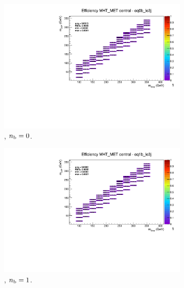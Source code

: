 \begin{figure}[h!]
  \centering
  \begin{subfigure}[b]{0.4\textwidth}
    \includegraphics[width=\textwidth, page=5]{Figs/sms/t2cc/v37/systs/T2cc_MHT_MET_eq0b_le3j.pdf}
    \caption{\njlow, $n_{\text{b}} = 0$.}
  \end{subfigure}
  \begin{subfigure}[b]{0.4\textwidth}
    \includegraphics[width=\textwidth, page=5]{Figs/sms/t2cc/v37/systs/T2cc_MHT_MET_eq1b_le3j.pdf}
    \caption{\njlow, $n_{\text{b}} = 1$.}
  \end{subfigure}\\
  \begin{subfigure}[b]{0.4\textwidth}

\end{subfigure}
\end{figure}
